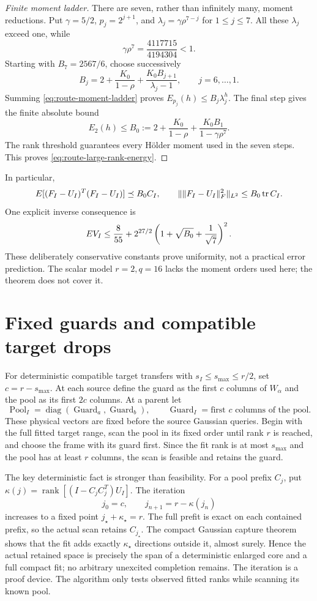 \documentclass[11pt,oneside,openany,a4paper]{report}
\numberwithin{equation}{chapter}
\theoremstyle{definition}
\theoremstyle{remark}
\DeclareMathOperator{\tr}{tr}\DeclareMathOperator{\rank}{rank}
\DeclareMathOperator{\diag}{diag}\DeclareMathOperator{\range}{range}
\begin{document}
\begin{proof}[Finite moment ladder]
There are seven, rather than infinitely many, moment reductions.  Put
$\gamma=5/2$, $p_j=2^{j+1}$, and
$\lambda_j=\gamma\rho^{7-j}$ for $1\leq j\leq7$.
All these $\lambda_j$ exceed one, while
\[
 \gamma\rho^7=\frac{4117715}{4194304}<1.
\]
Starting with $B_7=2567/6$, choose successively
\[
 B_j=2+\frac{K_0}{1-\rho}
       +\frac{K_0B_{j+1}}{\lambda_j-1},
 \qquad j=6,\ldots,1.
\]
Summing \eqref{eq:route-moment-ladder} proves
$E_{p_j}(h)\leq B_j\lambda_j^h$.  The final step gives the finite
absolute bound
\[
 E_2(h)\leq B_0:=2+\frac{K_0}{1-\rho}
             +\frac{K_0B_1}{1-\gamma\rho^7}.
\]
The rank threshold guarantees every Hölder moment used in the seven
steps.  This proves \eqref{eq:route-large-rank-energy}.
\end{proof}

In particular,
\[
 \E[(F_I-U_I)^T(F_I-U_I)]\preceq B_0C_I,
 \qquad
 \|\lVert F_I-U_I\rVert_F^2\|_{L^2}\leq B_0\tr C_I.
\]
One explicit inverse consequence is
\[
 E V_I\leq\frac8{55}
 +2^{27/2}\left(1+\sqrt{B_0}+\frac1{\sqrt7}\right)^2.
\]
These deliberately conservative constants prove uniformity, not a
practical error prediction.  The scalar model $r=2,q=16$ lacks the
moment orders used here; the theorem does not cover it.

\section{Fixed guards and compatible target drops}

For deterministic compatible target transfers with
$s_I\leq s_{\max}\leq r/2$, set $c=r-s_{\max}$.  At each source define
the guard as the first $c$ columns of $W_\alpha$ and the pool as its
first $2c$ columns.  At a parent let
\[
 \operatorname{Pool}_I=\diag(\operatorname{Guard}_a,
                             \operatorname{Guard}_b),
 \qquad
 \operatorname{Guard}_I=\text{first $c$ columns of the pool}.
\]
These physical vectors are fixed before the source Gaussian queries.
Begin with the full fitted target range, scan the pool in its fixed
order until rank $r$ is reached, and choose the frame with its guard
first.  Since the fit rank is at most $s_{\max}$ and the pool has at
least $r$ columns, the scan is feasible and retains the guard.

The key deterministic fact is stronger than feasibility.  For a pool
prefix $C_j$, put
$\kappa(j)=\rank[(I-C_jC_j^T)U_I]$.  The iteration
\[
 j_0=c,\qquad j_{n+1}=r-\kappa(j_n)
\]
increases to a fixed point $j_\star+\kappa_\star=r$.
The full prefit is exact on each contained prefix, so the actual scan
retains $C_{j_\star}$.  The compact Gaussian capture theorem shows that
the fit adds exactly $\kappa_\star$ directions outside it, almost
surely.  Hence the actual retained space is precisely the span of a
deterministic enlarged core and a full compact fit; no arbitrary
unexcited completion remains.  The iteration is a proof device.  The
algorithm only tests observed fitted ranks while scanning its known
pool.
\end{document}
